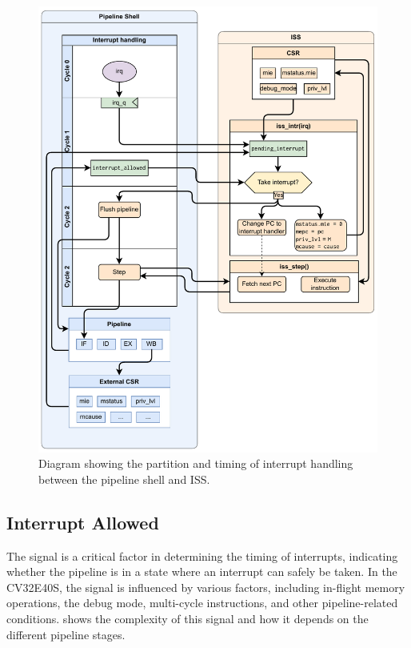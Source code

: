 \begin{figure}
    \centering
    \includegraphics[width=1\linewidth]{figures/PS_interrupt_timing.pdf}
    \caption{Diagram showing the partition and timing of interrupt handling between the pipeline shell and ISS.}
    \label{fig:ps_interrupt_timing}
\end{figure}


\subsection{Interrupt Allowed}
\label{sec:interrupt_allowed}


The  signal is a critical factor in determining the timing of interrupts, indicating whether the pipeline is in a state where an interrupt can safely be taken. In the CV32E40S, the signal is influenced by various factors, including in-flight memory operations, the debug mode, multi-cycle instructions, and other pipeline-related conditions.  shows the complexity of this signal and how it depends on the different pipeline stages.

